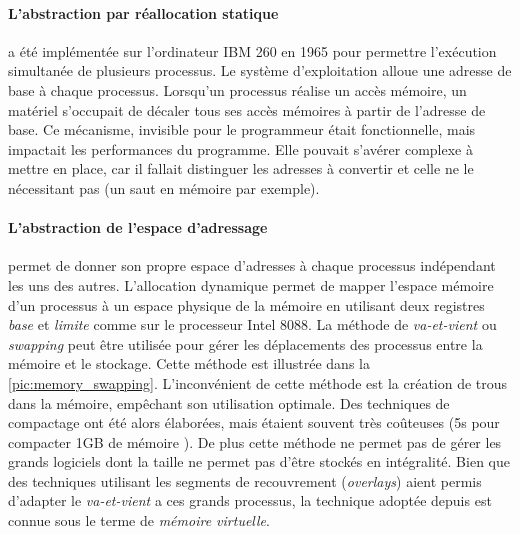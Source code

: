 \paragraph{L'abstraction par réallocation statique} a été implémentée sur l'ordinateur IBM 260 en 1965 \cite{Britannica} pour permettre l'exécution simultanée de plusieurs processus. Le système d'exploitation alloue une adresse de base à chaque processus. Lorsqu'un processus réalise un accès mémoire, un matériel s'occupait de décaler tous ses accès mémoires à partir de l'adresse de base. Ce mécanisme, invisible pour le programmeur était fonctionnelle, mais impactait les performances du programme. Elle pouvait s'avérer complexe à mettre en place, car il fallait distinguer les adresses à convertir et celle ne le nécessitant pas (un saut en mémoire par exemple).

\paragraph{L'abstraction de l'espace d'adressage} permet de donner son propre espace d'adresses à chaque processus indépendant les uns des autres. L'allocation dynamique permet de mapper l'espace mémoire d'un processus à un espace physique de la mémoire en utilisant deux registres \textit{base} et \textit{limite} comme sur le processeur Intel  8088. La méthode de \textit{va-et-vient} ou \textit{swapping} peut être utilisée pour gérer les déplacements des processus entre la mémoire et le stockage. Cette méthode est illustrée dans la \autoref{pic:memory_swapping}. L'inconvénient de cette méthode est la création de trous dans la mémoire, empêchant son utilisation optimale.  Des techniques de compactage ont été alors élaborées, mais étaient souvent très coûteuses (5s pour compacter 1GB de mémoire \cite{tanenbaum2008systeme}). De plus cette méthode ne permet pas de gérer les grands logiciels dont la taille ne permet pas d'être stockés en intégralité. Bien que des techniques utilisant les segments de recouvrement (\textit{overlays}) \cite{sherman1992method} aient permis  d'adapter le \textit{va-et-vient} a ces grands processus, la technique adoptée depuis est connue sous le terme de \textit{mémoire virtuelle}.

